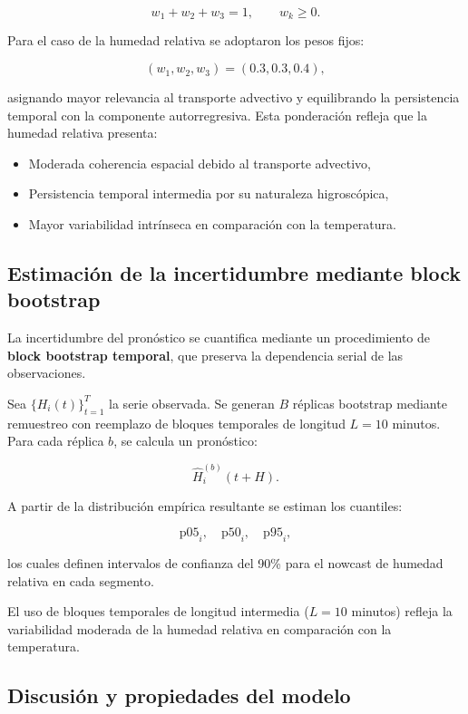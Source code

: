 \documentclass[
  spanish,
  us-letterpaper,
]{scrreprt}
\providecommand{\tightlist}{%
  \setlength{\itemsep}{0pt}\setlength{\parskip}{0pt}}
\numberwithin{equation}{section}
\begin{document}
\[
w_1 + w_2 + w_3 = 1, \qquad w_k \ge 0.
\]

Para el caso de la humedad relativa se adoptaron los pesos fijos:

\[
(w_1, w_2, w_3) = (0.3, 0.3, 0.4),
\]

asignando mayor relevancia al transporte advectivo y equilibrando la
persistencia temporal con la componente autorregresiva. Esta ponderación
refleja que la humedad relativa presenta:

\begin{itemize}
\tightlist
\item
  Moderada coherencia espacial debido al transporte advectivo,
\item
  Persistencia temporal intermedia por su naturaleza higroscópica,
\item
  Mayor variabilidad intrínseca en comparación con la temperatura.
\end{itemize}

\subsection{Estimación de la incertidumbre mediante block
bootstrap}\label{estimaciuxf3n-de-la-incertidumbre-mediante-block-bootstrap-1}

La incertidumbre del pronóstico se cuantifica mediante un procedimiento
de \textbf{block bootstrap temporal}, que preserva la dependencia serial
de las observaciones.

Sea \(\{H_i(t)\}_{t=1}^T\) la serie observada. Se generan \(B\) réplicas
bootstrap mediante remuestreo con reemplazo de bloques temporales de
longitud \(L = 10\) minutos. Para cada réplica \(b\), se calcula un
pronóstico:

\[
\hat{H}_i^{(b)}(t+H).
\]

A partir de la distribución empírica resultante se estiman los
cuantiles:

\[
\text{p05}_i, \quad \text{p50}_i, \quad \text{p95}_i,
\]

los cuales definen intervalos de confianza del 90\% para el nowcast de
humedad relativa en cada segmento.

El uso de bloques temporales de longitud intermedia (\(L = 10\) minutos)
refleja la variabilidad moderada de la humedad relativa en comparación
con la temperatura.

\subsection{Discusión y propiedades del
modelo}\label{discusiuxf3n-y-propiedades-del-modelo-1}
\end{document}
